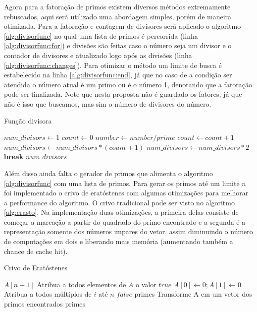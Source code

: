 \documentclass[12pt]{article}
\begin{document}
Agora para a fatoração de primos existem diversos métodos extremamente rebuscados, aqui será utilizado uma abordagem simples, porém de maneira otimizada. Para a fatoração e contagem de divisores será aplicado o algoritmo \ref{alg:divisorfunc} no qual uma lista de primos é percorrida (linha \ref{alg:divisorfunc:for}) e divisões são feitas caso o número seja um divisor e o contador de divisores e atualizado logo após as divisões (linha \ref{alg:divisorfunc:changes}). Para otimizar o método um limite de busca é estabelecido na linha \ref{alg:divisorfunc:end}, já que no caso de a condição ser atendida o número atual é um primo ou é o número 1, denotando que a fatoração pode ser finalizada. Note que nesta proposta não é guardado os fatores, já que não é isso que buscamos, mas sim o número de divisores do número.

\begin{algorithm}
	\caption{Função divisora\label{alg:divisorfunc}}
	\begin{algorithmic}[1]
		\State $num\_divisors\gets 1$
		\label{alg:divisorfunc:for}
		\State $count \gets 0$
		\label{alg:divisorfunc:changes}
		\State $number \gets number/prime$
		\State $count \gets count + 1$
		\EndWhile
		\State $num\_divisors \gets num\_divisors *(count+1)$
		\EndIf
		\label{alg:divisorfunc:end}
		\State $num\_divisors \gets num\_divisors * 2$
		\EndIf
		\State \textbf{break}
		\EndIf
		\EndFor
		\State \Return $num\_divisors$
		\EndProcedure
	\end{algorithmic}
\end{algorithm}

Além disso ainda falta o gerador de primos que alimenta o algoritmo \ref{alg:divisorfunc} com uma lista de primos. Para gerar os primos até um limite $n$ foi implementado o crivo de eratóstenes com algumas otimizações para melhorar a performance do algoritmo. O crivo tradicional pode ser visto no algoritmo \ref{alg:erasto}. Na implementação duas otimizações, a primeira delas consiste de começar a marcação a partir do quadrado do primo encontrado e a segunda é a representação somente dos números impares do vetor, assim diminuindo o número de computações em dois e liberando mais memória (aumentando também a chance de cache hit).


\begin{algorithm}
	\caption{Crivo de Eratóstenes\label{alg:erasto}}
	\begin{algorithmic}[1]
		\State $A[n+1]$ 
		\State Atribua a todos elementos de $A$ o valor $true$
		\State $A[0]\gets 0; A[1]\gets 0$
		\State Atribua a todos múltiplos de $i$ até $n$ $false$
		\EndIf
		\EndFor
		\State primes \gets Transforme A em um vetor dos primos encontrados
		\State \Return primes
		\EndProcedure
	\end{algorithmic}
\end{algorithm}
\end{document}
